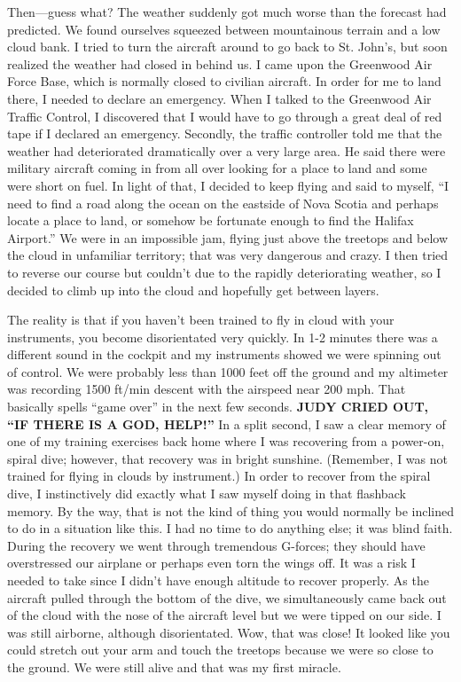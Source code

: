 \documentclass[twoside, 12pt]{book}
\begin{document}
Then—guess what? The weather suddenly got much worse than the forecast had predicted. We found ourselves squeezed between mountainous terrain and a low cloud bank. I tried to turn the aircraft around to go back to St. John’s, but soon realized the weather had closed in behind us. I  came upon the Greenwood Air Force Base, which is normally closed to civilian aircraft. In order for me to land there, I needed to declare an emergency. When I talked to the Greenwood Air Traffic Control, I discovered that I would have to go through a great deal of red tape if I declared an emergency. Secondly, the traffic controller told me that the weather had deteriorated dramatically over a very large area. He said there were military aircraft coming in from all over looking for a place to land and some were short on fuel. In light of that, I decided to keep flying and said to myself, “I need to find a road along the ocean on the eastside of Nova Scotia and perhaps locate a place to land, or somehow be fortunate enough to find the Halifax Airport.” We were in an impossible jam, flying just above the treetops and below the cloud in unfamiliar territory; that was very dangerous and crazy. I then tried to reverse our course but couldn’t due to the rapidly deteriorating weather, so I decided to climb up into the cloud and hopefully get between layers. 

The reality is that if you haven't been trained to fly in cloud with your instruments, you become disorientated very quickly. In 1-2 minutes there was a different sound in the cockpit and my instruments showed we were spinning out of control. We were probably less than 1000 feet off the ground and my altimeter was recording 1500 ft/min descent with the airspeed near 200 mph. That basically spells “game over” in the next few seconds. \textbf{JUDY CRIED OUT, “IF THERE IS A GOD, HELP!”} In a split second, I saw a clear memory of one of my training exercises back home where I was recovering from a power-on, spiral dive; however, that recovery was in bright sunshine. (Remember, I was not trained for flying in clouds by instrument.) In order to recover from the spiral dive, I instinctively did exactly what I saw myself doing in that flashback memory. By the way, that is not the kind of thing you would normally be inclined to do in a situation like this. I had no time to do anything else; it was blind faith. During the recovery we went through tremendous G-forces; they should have overstressed our airplane or perhaps even torn the wings off. It was a risk I needed to take since I didn’t have enough altitude to recover properly. As the aircraft pulled through the bottom of the dive, we simultaneously came back out of the cloud with the nose of the aircraft level but we were tipped on our side. I was still airborne, although disorientated. Wow, that was close! It looked like you could stretch out your arm and touch the treetops because we were so close to the ground. We were still alive and that was my first miracle. 
\end{document}
